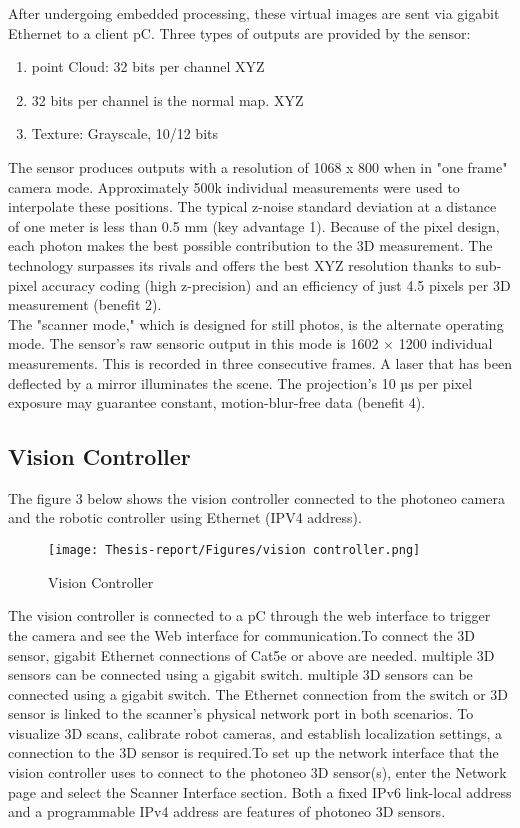 \documentclass[12pt]{article}
\begin{document}
After undergoing embedded processing, these virtual images are sent via gigabit Ethernet to a client pC.  Three types of outputs are provided by the sensor: \cite{ref15}
\begin{enumerate}
    \item point Cloud: 32 bits per channel  XYZ \cite{ref15}
    \item 32 bits per channel is the normal map.  XYZ \cite{ref15}
    \item Texture: Grayscale, 10/12 bits \cite{ref15}
\end{enumerate}

The sensor produces outputs with a resolution of 1068 x 800 when in "one frame" camera mode.  Approximately 500k individual measurements were used to interpolate these positions. The typical z-noise standard deviation at a distance of one meter is less than 0.5 mm (key advantage 1).  Because of the pixel design, each photon makes the best possible contribution to the 3D measurement.  The technology surpasses its rivals and offers the best XYZ resolution thanks to sub-pixel accuracy coding (high z-precision) and an efficiency of just 4.5 pixels per 3D measurement (benefit 2)\cite{ref15}. \\

The "scanner mode," which is designed for still photos, is the alternate operating mode.
 The sensor's raw sensoric output in this mode is 1602 × 1200 individual measurements. This is recorded in three consecutive frames. A laser that has been deflected by a mirror illuminates the scene.  The projection's 10 µs per pixel exposure may guarantee constant, motion-blur-free data (benefit 4)\cite{ref15}.


\subsection{Vision Controller}
The figure 3 below shows the vision controller connected to the photoneo camera and the robotic controller using Ethernet (IPV4 address).
\begin{figure}[h]
    \centering
    \texttt{[image: Thesis-report/Figures/vision controller.png]}
    \caption{Vision Controller \cite{ref2}}
    \label{fig:vision-controller}
\end{figure}
The vision controller is connected to a pC through the web interface to trigger the camera and see the Web interface for communication.To connect the 3D sensor, gigabit Ethernet connections of Cat5e or above are needed.  multiple 3D sensors can be connected using a gigabit switch.  multiple 3D sensors can be connected using a gigabit switch. The Ethernet connection from the switch or 3D sensor is linked to the scanner's physical network port in both scenarios. To visualize 3D scans, calibrate robot cameras, and establish localization settings, a connection to the 3D sensor is required.To set up the network interface that the vision controller uses to connect to the photoneo 3D sensor(s), enter the Network page and select the Scanner Interface section. Both a fixed IPv6 link-local address and a programmable IPv4 address are features of photoneo 3D sensors.\cite{ref15}
\end{document}
